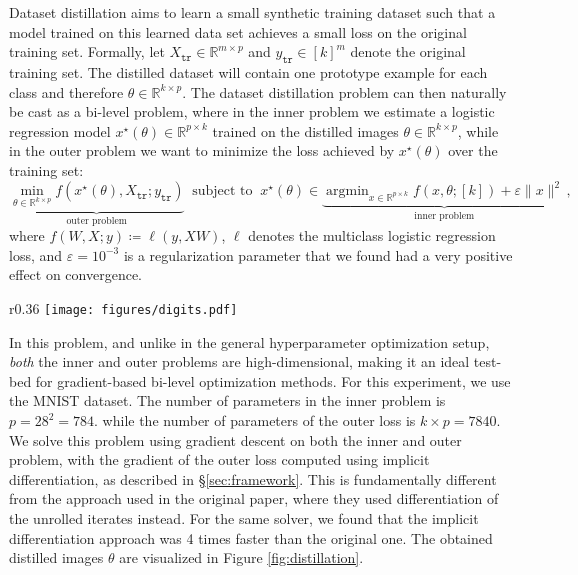 \documentclass{article}
\def\RR{{\mathbb R}}
\DeclareMathOperator*{\argmin}{argmin}
\def\training{{\mathtt{tr}}}
\begin{document}
Dataset distillation \cite{wang2018dataset,lorraine_2020} aims to
learn a small synthetic training dataset such that a model trained on this
learned data set achieves a small loss on the original training set. 
Formally, let
$X_\training \in \RR^{m \times p}$ and $y_\training \in [k]^m$ 
denote the original training set. 
The distilled dataset will contain one prototype example
for each class and therefore $\theta \in \RR^{k \times p}$. 
The dataset distillation problem can then naturally be cast as a
bi-level problem, where in the inner problem we estimate a logistic regression
model $x^\star(\theta) \in \RR^{p \times k}$ trained on the distilled images $\theta \in
\RR^{k \times p}$, while in the outer problem we want to minimize the loss
achieved by $x^\star(\theta)$ over the training set: 
\begin{equation}
\underbrace{\min_{\theta \in \mathbb{R}^{k \times p}} f(x^\star(\theta),
X_\training; y_\training)}_{\text{outer problem}} ~\text{ subject to }~
x^\star(\theta) \in \underbrace{\argmin_{x \in \RR^{p \times k}} f(x, \theta; [k]) +
\varepsilon \|x\|^2\,}_{\text{inner problem}},
\label{eq:bilevel_distillation}
\end{equation}
where $f(W, X; y) \coloneqq \ell(y, XW)$, $\ell$ denotes the
multiclass logistic regression loss, and
$\varepsilon = 10^{-3}$ is a regularization parameter that we found had
a very positive effect on convergence.

\begin{wrapfigure}[16]{r}{0.36\textwidth}
    \centering
    \vspace{-0.5cm}
    \texttt{[image: figures/digits.pdf]}\\
\caption{Distilled dataset $\theta \in \RR^{k \times p}$ obtained by
    solving \eqref{eq:bilevel_distillation}. 
}
    \label{fig:distillation}
\end{wrapfigure}

In this problem, and unlike in the general hyperparameter optimization setup,
\emph{both} the inner and outer problems are high-dimensional, making it an
ideal test-bed for gradient-based bi-level optimization methods. 
For this experiment, we use the MNIST dataset.
The number of
parameters in the inner problem is $p = 28^2 = 784$.  while the number of
parameters of the outer loss is $k\times p = 7840$.
We solve this problem using gradient descent on both the inner and outer
problem, with the gradient of the outer loss computed using implicit
differentiation, as described in \S\ref{sec:framework}. This is
fundamentally different from the approach used in the original paper, where they
used differentiation of the unrolled iterates instead.
For the same solver, we found that the implicit differentiation approach was 4
times faster than the original one.  The obtained distilled images $\theta$ are
visualized in Figure \ref{fig:distillation}.
\end{document}
